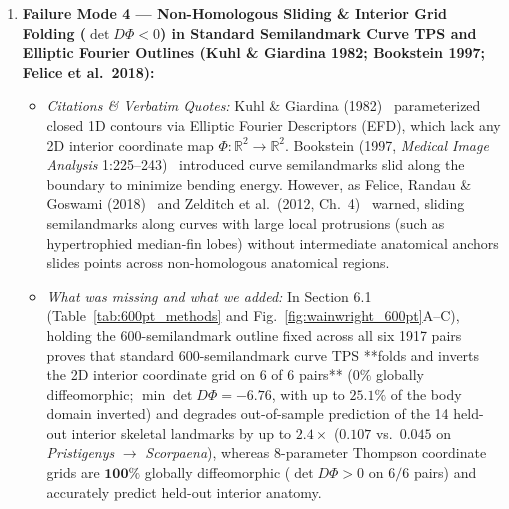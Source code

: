 \documentclass[11pt,a4paper]{article}
\theoremstyle{definition}
\theoremstyle{remark}
\newcommand{\R}{\mathbb{R}}
\begin{document}
\begin{enumerate}
  \item \textbf{Failure Mode 4 --- Non-Homologous Sliding \& Interior Grid Folding ($\det D\Phi < 0$) in Standard Semilandmark Curve TPS and Elliptic Fourier Outlines (Kuhl \& Giardina 1982; Bookstein 1997; Felice et al.\ 2018):}
  \begin{itemize}
    \item \emph{Citations \& Verbatim Quotes:} Kuhl \& Giardina (1982)~\cite{KuhlGiardina1982} parameterized closed 1D contours via Elliptic Fourier Descriptors (EFD), which lack any 2D interior coordinate map $\Phi: \R^2 \to \R^2$. Bookstein (1997, \emph{Medical Image Analysis} 1:225--243)~\cite{Bookstein1997} introduced curve semilandmarks slid along the boundary to minimize bending energy. However, as Felice, Randau \& Goswami (2018)~\cite{Felice2018SysBio} and Zelditch et al.\ (2012, Ch.\ 4)~\cite{Zelditch2012} warned, sliding semilandmarks along curves with large local protrusions (such as hypertrophied median-fin lobes) without intermediate anatomical anchors slides points across non-homologous anatomical regions.
    \item \emph{What was missing and what we added:} In Section 6.1 (Table~\ref{tab:600pt_methods} and Fig.~\ref{fig:wainwright_600pt}A--C), holding the 600-semilandmark outline fixed across all six 1917 pairs proves that standard 600-semilandmark curve TPS **folds and inverts the 2D interior coordinate grid on $6$ of $6$ pairs** ($0\%$ globally diffeomorphic; $\min \det D\Phi = -6.76$, with up to $25.1\%$ of the body domain inverted) and degrades out-of-sample prediction of the 14 held-out interior skeletal landmarks by up to $2.4\times$ ($0.107$ vs.\ $\mathbf{0.045}$ on \emph{Pristigenys} $\to$ \emph{Scorpaena}), whereas 8-parameter Thompson coordinate grids are $\mathbf{100\%}$ globally diffeomorphic ($\det D\Phi > 0$ on $6/6$ pairs) and accurately predict held-out interior anatomy.
  \end{itemize}


\end{enumerate}
\end{document}
